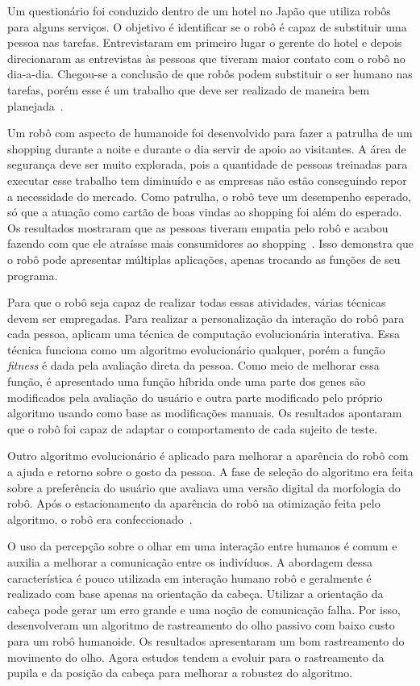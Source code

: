 Um questionário foi conduzido dentro de um hotel no Japão que utiliza robôs para alguns serviços. O objetivo é identificar se o robô é capaz de substituir uma pessoa nas tarefas. Entrevistaram em primeiro lugar o gerente do hotel e depois direcionaram as entrevistas às pessoas que tiveram maior contato com o robô no dia-a-dia. Chegou-se a conclusão de que robôs podem substituir o ser humano nas tarefas, porém esse é um trabalho que deve ser realizado de maneira bem planejada~\cite{osawa:2017}.

Um robô com aspecto de humanoide foi desenvolvido para fazer a patrulha de um shopping durante a noite e durante o dia servir de apoio ao visitantes. A área de segurança deve ser muito explorada, pois a quantidade de pessoas treinadas para executar esse trabalho tem diminuído e as empresas não estão conseguindo repor a necessidade do mercado. Como patrulha, o robô teve um desempenho esperado, só que a atuação como cartão de boas vindas ao shopping foi além do esperado. Os resultados mostraram que as pessoas tiveram empatia pelo robô e acabou fazendo com que ele atraísse mais consumidores ao shopping~\cite{lopez:2017}. Isso demonstra que o robô pode apresentar múltiplas aplicações, apenas trocando as funções de seu programa.

Para que o robô seja capaz de realizar todas essas atividades, várias técnicas devem ser empregadas. Para realizar a personalização da interação do robô para cada pessoa, \textcite{suga:2006} aplicam uma técnica de computação evolucionária interativa. Essa técnica funciona como um algoritmo evolucionário qualquer, porém a função \emph{fitness} é dada pela avaliação direta da pessoa. Como meio de melhorar essa função, é apresentado uma função híbrida onde uma parte dos genes são modificados pela avaliação do usuário e outra parte modificado pelo próprio algoritmo usando como base as modificações manuais. Os resultados apontaram que o robô foi capaz de adaptar o comportamento de cada sujeito de teste.

Outro algoritmo evolucionário é aplicado para melhorar a aparência do robô com a ajuda e retorno sobre o gosto da pessoa. A fase de seleção do algoritmo era feita sobre a preferência do usuário que avaliava uma versão digital da morfologia do robô. Após o estacionamento da aparência do robô na otimização feita pelo algoritmo, o robô era confeccionado~\cite{debeir:2016}.

O uso da percepção sobre o olhar em uma interação entre humanos é comum e auxilia a melhorar a comunicação entre os indivíduos. A abordagem dessa característica é pouco utilizada em interação humano robô e geralmente é realizado com base apenas na orientação da cabeça. Utilizar a orientação da cabeça pode gerar um erro grande e uma noção de comunicação falha. Por isso, \textcite{palinko:2016} desenvolveram um algoritmo de rastreamento do olho passivo com baixo custo para um robô humanoide. Os resultados apresentaram um bom rastreamento do movimento do olho. Agora estudos tendem a evoluir para o rastreamento da pupila e da posição da cabeça para melhorar a robustez do algoritmo.

